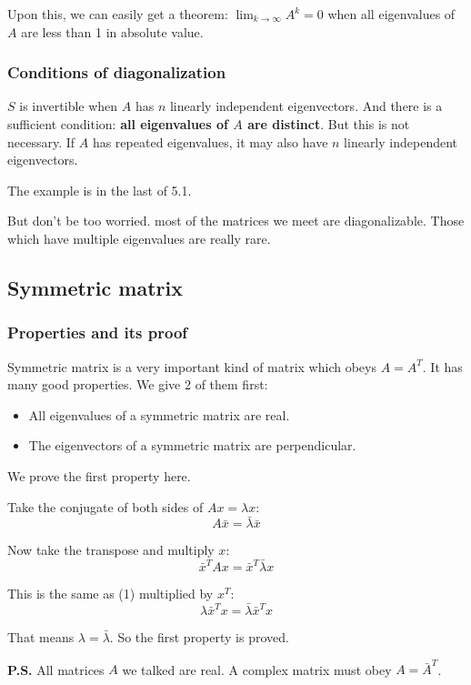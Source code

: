 \documentclass[12pt]{ctexart}
\begin{document}
Upon this, we can easily get a theorem: $\lim_{k \to \infty} A^k = 0$ when all
eigenvalues of $A$ are less than 1 in absolute value.

\subsubsection{\textbf{Conditions of diagonalization}}

$S$ is invertible when $A$ has $n$ linearly independent eigenvectors. And there is a
sufficient condition: \textbf{all eigenvalues of $A$ are distinct}. But this is not necessary.
If $A$ has repeated eigenvalues, it may also have $n$ linearly independent eigenvectors.

The example is in the last of 5.1.

But don't be too worried. most of the matrices we meet are diagonalizable. Those which
have multiple eigenvalues are really rare.

\subsection{\textbf{Symmetric matrix}}
\subsubsection{\textbf{Properties and its proof}}

Symmetric matrix is a very important kind of matrix which obeys $A = A^{T}$. It has many
good properties. We give 2 of them first:
\begin{itemize}
  \item All eigenvalues of a symmetric matrix are real.
  \item The eigenvectors of a symmetric matrix are perpendicular.
\end{itemize}

We prove the first property here.

Take the conjugate of both sides of $Ax = \lambda x$:
\[
  A\bar{x} = \bar{\lambda}\bar{x} \tag{1}
\]

Now take the transpose and multiply $x$:
\[
  \bar{x}^{T}Ax = \bar{x}^{T}\bar{\lambda}x \tag{2}
\]

This is the same as (1) multiplied by $x^{T}$:
\[
  \lambda \bar{x}^{T}x = \bar{\lambda} \bar{x}^{T}x \tag{3}
\]

That means $\lambda = \bar{\lambda}$. So the first property is proved.

\textbf{P.S.} All matrices $A$ we talked are real. A complex matrix must obey $A =
\bar{A}^{T}$.
\end{document}
